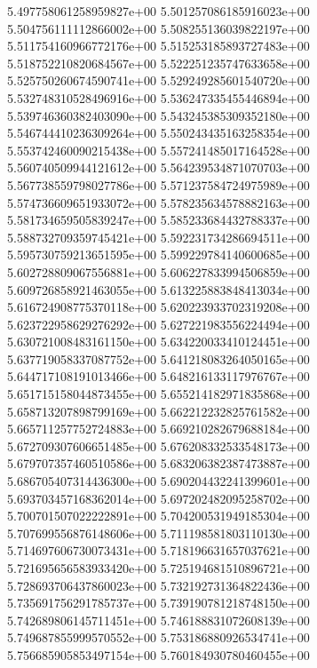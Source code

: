 5.497758061258959827e+00	5.501257086185916023e+00	5.504756111112866002e+00	5.508255136039822197e+00	5.511754160966772176e+00	5.515253185893727483e+00	5.518752210820684567e+00	5.522251235747633658e+00	5.525750260674590741e+00	5.529249285601540720e+00	5.532748310528496916e+00	5.536247335455446894e+00	5.539746360382403090e+00	5.543245385309352180e+00	5.546744410236309264e+00	5.550243435163258354e+00	5.553742460090215438e+00	5.557241485017164528e+00	5.560740509944121612e+00	5.564239534871070703e+00	5.567738559798027786e+00	5.571237584724975989e+00	5.574736609651933072e+00	5.578235634578882163e+00	5.581734659505839247e+00	5.585233684432788337e+00	5.588732709359745421e+00	5.592231734286694511e+00	5.595730759213651595e+00	5.599229784140600685e+00	5.602728809067556881e+00	5.606227833994506859e+00	5.609726858921463055e+00	5.613225883848413034e+00	5.616724908775370118e+00	5.620223933702319208e+00	5.623722958629276292e+00	5.627221983556224494e+00	5.630721008483161150e+00	5.634220033410124451e+00	5.637719058337087752e+00	5.641218083264050165e+00	5.644717108191013466e+00	5.648216133117976767e+00	5.651715158044873455e+00	5.655214182971835868e+00	5.658713207898799169e+00	5.662212232825761582e+00	5.665711257752724883e+00	5.669210282679688184e+00	5.672709307606651485e+00	5.676208332533548173e+00	5.679707357460510586e+00	5.683206382387473887e+00	5.686705407314436300e+00	5.690204432241399601e+00	5.693703457168362014e+00	5.697202482095258702e+00	5.700701507022222891e+00	5.704200531949185304e+00	5.707699556876148606e+00	5.711198581803110130e+00	5.714697606730073431e+00	5.718196631657037621e+00	5.721695656583933420e+00	5.725194681510896721e+00	5.728693706437860023e+00	5.732192731364822436e+00	5.735691756291785737e+00	5.739190781218748150e+00	5.742689806145711451e+00	5.746188831072608139e+00	5.749687855999570552e+00	5.753186880926534741e+00	5.756685905853497154e+00	5.760184930780460455e+00
